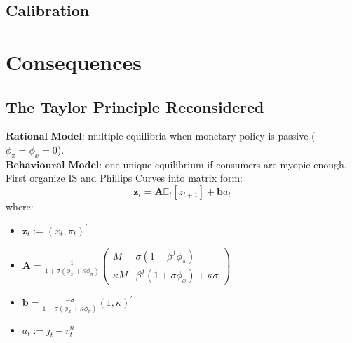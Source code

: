 \documentclass{beamer}
\newcommand\ReduceFont{\fontsize{10}{7.2}\selectfont}
\begin{document}
\subsection{Calibration}


\section{Consequences}
\begin{frame}
    \ReduceFont
\end{frame}

\begin{frame}
    \tableofcontents[currentsection, hideothersubsections, sections=\value{section}]
\end{frame}

\subsection{The Taylor Principle Reconsidered}

\begin{frame}{\subsecname}
    $\textbf{Rational Model}$: multiple equilibria when monetary policy is passive ($\phi_{\pi}=\phi_{x}=0$).\\
    $\textbf{Behavioural Model}$: one unique equilibrium if consumers are myopic enough.\\
    First organize IS and Phillips Curves into matrix form:\\ 
    \begin{equation}\tag{32}                                     \textbf{z}_{t}=\textbf{A}\mathbb{E}_{t}\left[z_{t+1}\right]+\textbf{b}a_{t}
    \end{equation}
    where:
    \begin{itemize}
        \item $\textbf{z}_{t}:=(x_{t},\pi_{t})^{\prime}$
        \item $\textbf{A}=\frac{1}{1+\sigma(\phi_{x}+\kappa\phi_{\pi})}\begin{pmatrix} M & \sigma(1-\beta^{f}\phi_{\pi}) \\ \kappa M & \beta^{f}(1+\sigma\phi_{x})+\kappa\sigma \end{pmatrix}$
        \item $\textbf{b}=\frac{-\sigma}{1+\sigma(\phi_{x}+\kappa\phi_{\pi})}(1,\kappa)^{\prime}$
        \item $a_{t}:=j_{t}-r_{t}^{n}$
    \end{itemize}
\end{frame}
\end{document}
